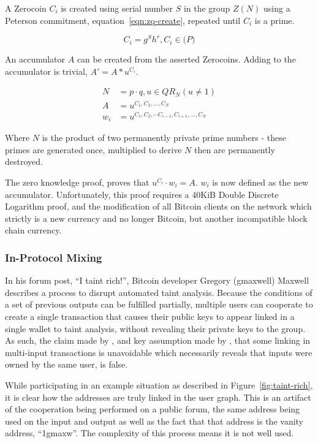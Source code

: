 A Zerocoin $C_{i}$ is created using serial number $S$ in the group $Z(N)$ using a Peterson commitment, equation~\ref{eqn:zq-create}, repeated until $C_i$ is a prime.

\begin{equation}\label{eqn:zq-create}
C_{i}=g^Sh^r, C_i \in \mathbb(P)
\end{equation}

An accumulator $A$ can be created from the asserted Zerocoins.  Adding to the accumulator is trivial, $A' = A*u^{C_i}$.

\begin{subequations}
    \begin{align}\label{eqn:zkp}
        N &= p \cdot q, u \in QR_{N}(u\neq1)\\
        A &= u^{C_1, C_2,\dots,C_N}\\
        w_i &=  u^{C_1, C_2,\cdots C_{i-1}, C_{i+1}, \dots ,C_N}
    \end{align}
\end{subequations}

Where $N$ is the product of two permanently private prime numbers - these primes are generated once, multiplied to derive $N$ then are permanently destroyed.

The zero knowledge proof, proves that $u^{C_i} \cdot w_i = A$. $w_i$ is now defined as the new accumulator. Unfortunately, this proof requires a 40KiB Double Discrete Logarithm proof, and the modification of all Bitcoin clients on the network which strictly is a new currency and no longer Bitcoin, but another incompatible block chain currency.

\subsubsection{In-Protocol Mixing}
In his forum post, ``I taint rich!'', Bitcoin developer Gregory (gmaxwell) Maxwell~\cite{taint-rich} describes a process to disrupt automated taint analysis.  Because the conditions of a set of previous outputs can be fulfilled partially, multiple users can cooperate to create a single transaction that causes their public keys to appear linked in a single wallet to taint analysis, without revealing their private keys to the group.  As such, the claim made by \textcite{satoshi}, and key assumption made by \textcite{reid-anon}, that some linking in multi-input transactions is unavoidable which necessarily reveals that inputs were owned by the same user, is false.

While participating in an example situation as described in Figure~\ref{fig:taint-rich}, it is clear how the addresses are truly linked in the user graph.  This is an artifact of the cooperation being performed on a public forum, the same address being used on the input and output as well as the fact that that address is the vanity address, ``1gmaxw''. The complexity of this process means it is not well used.

